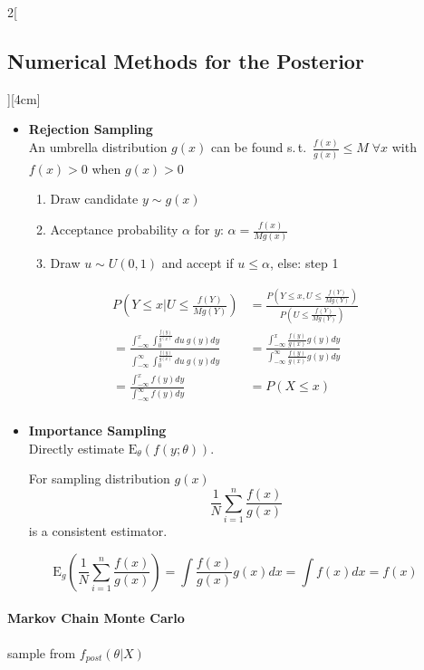\documentclass[8pt]{extarticle}
\begin{document}
\begin{multicols}{2}[\subsection{Numerical Methods for the Posterior}][4cm]
\begin{itemize}
\item \textbf{Rejection Sampling} \\
An umbrella distribution $g(x)$ can be found s.\,t.\ $\frac{f(x)}{g(x)} \leq M \;\forall x$ with $f(x)>0$ when $g(x)>0$ 
\vspace{-0.5em}
\begin{enumerate}
\item Draw candidate $y\sim g(x)$
\item Acceptance probability $\alpha$ for $y$: $\alpha = \frac{f(x)}{Mg(x)}$
\item Draw $u \sim U(0,1)$ and accept if $u\leq\alpha$, else: step 1
\end{enumerate}
\end{itemize}
\begin{Proof}
\vspace{-1.3em}
\begin{align*}
P\left(Y\leq x|U\leq\frac{f(Y)}{Mg(Y)}\right) 
&= \frac{P\left(Y\leq x, U\leq\frac{f(Y)}{Mg(Y)}\right)}{P\left(U\leq\frac{f(Y)}{Mg(Y)}\right)}\\
=\frac{\int_{-\infty}^x \int_0^{\frac{f(y)}{g(x)}} du\: g(y) dy}{\int_{-\infty}^\infty \int_0^{\frac{f(y)}{g(x)}} du\: g(y) dy} 
&= \frac{\int_{-\infty}^x \frac{f(y)}{g(x)} g(y) dy}{\int_{-\infty}^\infty \frac{f(y)}{g(x)} g(y) dy}\\
= \frac{\int_{-\infty}^x f(y) dy}{\int_{-\infty}^\infty f(y) dy} &= P(X\leq x)\\
\end{align*}
\end{Proof}

\begin{itemize}
\item \textbf{Importance Sampling} \\
Directly estimate $\mathrm{E}_\theta(f(y;\theta))$.

For sampling distribution $g(x)$
$$\frac{1}{N}\sum_{i=1}^n \frac{f(x)}{g(x)}$$
is a consistent estimator.
\end{itemize}
\begin{Proof}
\vspace{-1em}
$$\mathrm{E}_g\left(\frac{1}{N}\sum_{i=1}^n \frac{f(x)}{g(x)}\right) = \int \frac{f(x)}{g(x)}g(x)dx = \int f(x) dx = f(x)$$
\end{Proof}



\paragraph{Markov Chain Monte Carlo} sample from $f_{post}(\theta|X)$


\end{multicols}
\end{document}
